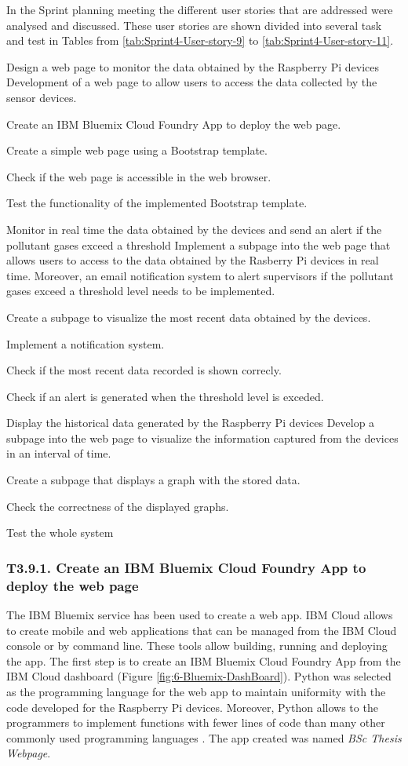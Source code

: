 In the Sprint planning meeting the different user stories that are addressed were analysed and discussed. These user stories  are shown divided into several task and test in Tables from \ref{tab:Sprint4-User-story-9} to \ref{tab:Sprint4-User-story-11}.

{Design a web page to monitor the data obtained by the Raspberry Pi devices}
{Development of a web page to allow users to access the data collected by the sensor devices.}
{	\item Create an IBM Bluemix Cloud Foundry App to deploy the web page.
	\item Create a simple web page using a Bootstrap template.
}{	\item Check if the web page is accessible in the web browser.
	\item Test the functionality of the implemented Bootstrap template.
}

{Monitor in real time the data obtained by the devices and send an alert if the pollutant gases exceed a threshold}
{Implement a subpage into the web page that allows users to access to the data obtained by the Rasberry Pi devices in real time. Moreover, an email notification system to alert supervisors if the pollutant gases exceed a threshold level needs to be implemented.}
{	\item Create a subpage to visualize the most recent data obtained by the devices.
	\item Implement a notification system.
}{	\item Check if the most recent data recorded is shown correcly.
	\item Check if an alert is generated when the threshold level is exceded.
}

{Display the historical data generated by the Raspberry Pi devices}
{Develop a subpage into the web page to visualize the information captured from the devices in an interval of time.}
{	\item Create a subpage that displays a graph with the stored data.
}{	\item Check the correctness of the displayed graphs.
	\item Test the whole system
}


\subsubsection{T3.9.1. Create an IBM Bluemix Cloud Foundry App to deploy the web page}
The IBM Bluemix service has been used to create a web app. IBM Cloud allows to create mobile and web applications that can be managed from the IBM Cloud console or by command line. These tools allow building, running and deploying the app. The first step is to create an IBM Bluemix Cloud Foundry App from the IBM Cloud dashboard (Figure \ref{fig:6-Bluemix-DashBoard}). Python was selected as the programming language for the web app to maintain uniformity with the code developed for the Raspberry Pi devices. Moreover, Python allows to the programmers to implement functions with fewer lines of code than many other commonly used programming languages \cite{Pre00}. The app created was named \textit{BSc Thesis Webpage}.

